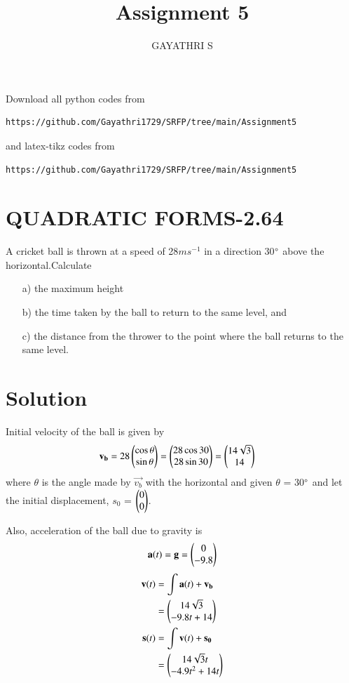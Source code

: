 \documentclass[journal,12pt,twocolumn]{IEEEtran}
\begin{document}
     \def\rightbox#1{\makebox[0in][r]{#1}}
     \def\centbox#1{\makebox[0in]{#1}}
     \def\topbox#1{\raisebox{-\baselineskip}[0in][0in]{#1}}
     \def\midbox#1{\raisebox{-0.5\baselineskip}[0in][0in]{#1}}
\vspace{3cm}
\title{Assignment 5}
\author{GAYATHRI S}
\maketitle
\newpage
\bigskip
\renewcommand{\thefigure}{\theenumi}
\renewcommand{\thetable}{\theenumi}
Download all python codes from 
\begin{lstlisting}
https://github.com/Gayathri1729/SRFP/tree/main/Assignment5
\end{lstlisting}
%
and latex-tikz codes from 
%
\begin{lstlisting}
https://github.com/Gayathri1729/SRFP/tree/main/Assignment5
\end{lstlisting}
%
\section{QUADRATIC FORMS-2.64}
A cricket ball is thrown at a speed of 28$ms^{-1}$ in a direction 30$\degree$ above the horizontal.Calculate
\begin{enumerate}
\item[a)]the maximum height
\item[b)]the time taken by the ball to return to the same level, and
\item[c)]the distance from the thrower to the point where the ball returns to the same level.
\end{enumerate}
%
\section{Solution}
%
Initial velocity of the ball is given by
\begin{align}
    \mathbf{v_b} &= 28\begin{pmatrix}\cos\theta \\ \sin\theta\end{pmatrix} =\begin{pmatrix}28\cos 30 \\ 28\sin 30\end{pmatrix} =\begin{pmatrix}14\sqrt{3} \\ 14\end{pmatrix} 
\end{align}
where $\theta$ is the angle made by $\vec{v_b}$ with the horizontal and given  $\theta$ = 30$\degree$ and let the initial displacement, $s_0$ = $\begin{pmatrix}0\\0\end{pmatrix}$.

Also, acceleration of the ball due to gravity is 
\begin{equation}
    \mathbf{a}(t) = \mathbf{g} = \begin{pmatrix}0 \\ -9.8\end{pmatrix}
\end{equation}
\begin{align}
\mathbf{v}(t)&=\int{\mathbf{a}(t)} + \mathbf{v_b}    \\
          &=\begin{pmatrix}14\sqrt{3}\\-9.8t+14\end{pmatrix}\\
\mathbf{s}(t)&=\int{\mathbf{v}(t)} + \mathbf{s_0}    \\     
            &=\begin{pmatrix}14\sqrt{3}t\\-4.9{t^2}+14t\end{pmatrix}
\end{align}
\end{document}

